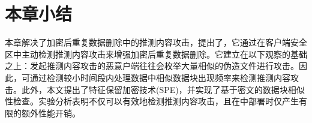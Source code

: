 \section{本章小结}
\label{sec:featurespy-conclusion}
本章解决了加密后重复数据删除中的推测内容攻击，提出了\sysnameF，它通过在客户端安全区中主动检测推测内容攻击来增强加密后重复数据删除。它建立在以下观察的基础之上：发起推测内容攻击的恶意户端往往会枚举大量相似的伪造文件进行攻击。因此，可通过检测较小时间段内处理数据中相似数据块出现频率来检测推测内容攻击。此外，本文提出了特征保留加密技术(SPE)，并实现了基于密文的数据块相似性检查。实验分析表明\sysnameF 不仅可以有效地检测推测内容攻击，且在\sysnameS 中部署时仅产生有限的额外性能开销。

